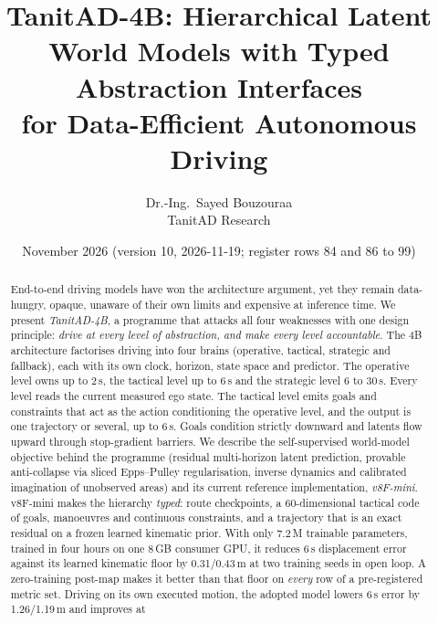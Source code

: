 \documentclass[10pt,twocolumn]{article}
\title{\vspace{-6mm}\textbf{TanitAD-4B: Hierarchical Latent World Models with Typed Abstraction Interfaces\\for Data-Efficient Autonomous Driving}}
\author{Dr.-Ing.\ Sayed Bouzouraa\\[1mm]\normalsize TanitAD Research}
\date{November 2026 (version 10, 2026-11-19; register rows 84 and 86 to 99)}
\theoremstyle{remark}
\begin{document}
\maketitle

\begin{abstract}
End-to-end driving models have won the architecture argument, yet they remain data-hungry, opaque, unaware of their own limits and
expensive at inference time. We present \emph{TanitAD-4B}, a programme that attacks all four weaknesses with one design principle:
\emph{drive at every level of abstraction, and make every level accountable}. The 4B architecture factorises driving into four
brains (operative, tactical, strategic and fallback), each with its own clock, horizon, state space and predictor. The operative
level owns up to 2\,s, the tactical level up to 6\,s and the strategic level 6 to 30\,s. Every level reads the current measured ego state.
The tactical level emits goals and constraints that act as the action conditioning the operative level, and the output is one
trajectory or several, up to 6\,s. Goals condition strictly downward and latents flow upward through stop-gradient barriers. We describe the self-supervised world-model objective
behind the programme (residual multi-horizon latent prediction, provable anti-collapse via sliced Epps--Pulley regularisation,
inverse dynamics and calibrated imagination of unobserved areas) and its current reference implementation, \emph{v8F-mini}.
v8F-mini makes the hierarchy \emph{typed}: route checkpoints, a 60-dimensional tactical code of goals, manoeuvres and continuous
constraints, and a trajectory that is an exact residual on a frozen learned kinematic prior. With only 7.2\,M trainable parameters,
trained in four hours on one 8\,GB consumer GPU, it reduces 6\,s displacement error against its learned kinematic floor by
0.31/0.43\,m at two training seeds in open loop. A zero-training post-map makes it better than that floor on \emph{every} row of a
pre-registered metric set. Driving on its own executed motion, the adopted model lowers 6\,s error by 1.26/1.19\,m and improves at

\end{abstract}
\end{document}
